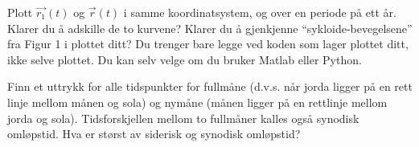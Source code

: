 \documentclass{../../myassignment}
\begin{document}
	\newpage

	\begin{problem}
		Plott $\vec{r_1}(t)$ og $\vec{r}(t)$ i samme koordinatsystem, og over en periode på ett år. Klarer du å adskille de to kurvene? Klarer du å gjenkjenne “sykloide-bevegelsene” fra Figur 1 i plottet ditt? Du trenger bare legge ved koden som lager plottet ditt, ikke selve plottet. Du kan selv velge om du bruker Matlab eller Python.
	\end{problem}
	\begin{answer}
		
	\end{answer}

	\begin{problem}
		Finn et uttrykk for alle tidspunkter for fullmåne (d.v.s. når jorda ligger på en rett linje mellom månen og sola) og nymåne (månen ligger på en rettlinje mellom jorda og sola). Tidsforskjellen mellom to fullmåner kalles også synodisk omløpstid. Hva er størst av siderisk og synodisk omløpstid?	
	\end{problem}	
\end{document}
